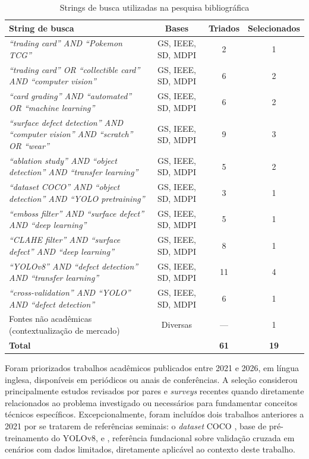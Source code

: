 \documentclass[
    12pt,                %
    openright,           %
    oneside,             %
    a4paper,             %
    english,             %
    brazil               %
]{abntex2}
\begin{document}
\begin{table}[htb]
\centering
\caption{Strings de busca utilizadas na pesquisa bibliográfica}
\label{tab:strings_busca}
\footnotesize
\begin{tabular}{p{7.5cm}|c|c|c}
\toprule
\textbf{String de busca} & \textbf{Bases} & \textbf{Triados} & \textbf{Selecionados} \\
\midrule
\textit{``trading card'' AND ``Pokemon TCG''} 
    & GS, IEEE, SD, MDPI & 2 & 1 \\
\midrule
\textit{``trading card'' OR ``collectible card'' AND ``computer vision''} 
    & GS, IEEE, SD, MDPI & 6 & 2 \\
\midrule
\textit{``card grading'' AND ``automated'' OR ``machine learning''} 
    & GS, IEEE, SD, MDPI & 6 & 2 \\
\midrule
\textit{``surface defect detection'' AND ``computer vision'' AND ``scratch'' OR ``wear''} 
    & GS, IEEE, SD, MDPI & 9 & 3 \\
\midrule
\textit{``ablation study'' AND ``object detection'' AND ``transfer learning''} 
    & GS, IEEE, SD, MDPI & 5 & 2 \\
\midrule
\textit{``dataset COCO'' AND ``object detection'' AND ``YOLO pretraining''} 
    & GS, IEEE, SD, MDPI & 3 & 1 \\
\midrule
\textit{``emboss filter'' AND ``surface defect'' AND ``deep learning''} 
    & GS, IEEE, SD, MDPI & 5 & 1 \\
\midrule
\textit{``CLAHE filter'' AND ``surface defect'' AND ``deep learning''} 
    & GS, IEEE, SD, MDPI & 8 & 1 \\
\midrule
\textit{``YOLOv8'' AND ``defect detection'' AND ``transfer learning''} 
    & GS, IEEE, SD, MDPI & 11 & 4 \\
\midrule
\textit{``cross-validation'' AND ``YOLO'' AND ``defect detection''} 
    & GS, IEEE, SD, MDPI & 6 & 1 \\
\midrule
Fontes não acadêmicas (contextualização de mercado) 
    & Diversas & — & 1 \\
\midrule
\textbf{Total} & & \textbf{61} & \textbf{19} \\
\bottomrule
\end{tabular}
\end{table}

Foram priorizados trabalhos acadêmicos publicados entre 2021 e 2026, 
em língua inglesa, disponíveis em periódicos ou anais de conferências. 
A seleção considerou principalmente estudos revisados por pares e 
\textit{surveys} recentes quando diretamente relacionados ao problema 
investigado ou necessários para fundamentar conceitos técnicos 
específicos. Excepcionalmente, foram incluídos dois trabalhos anteriores 
a 2021 por se tratarem de referências seminais: o \textit{dataset} COCO 
\cite{Lin2014}, base de pré-treinamento do YOLOv8, e 
, referência fundacional sobre validação cruzada 
em cenários com dados limitados, diretamente aplicável ao contexto 
deste trabalho.
\end{document}
